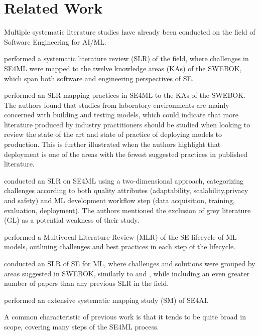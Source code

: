 \chapter{Related Work}
Multiple systematic literature studies have already been conducted on the field of Software Engineering for AI/ML.

\textcite{Kumeno2020} performed a systematic literature review (SLR) of the field, where challenges in SE4ML were mapped to the twelve knowledge areas (KAs) of the SWEBOK, which span both software and engineering perspectives of SE.

\textcite{Nascimento2020} performed an SLR mapping practices in SE4ML to the KAs of the SWEBOK.
The authors found that studies from laboratory environments are mainly concerned with building and testing models, which could indicate that more literature produced by industry practitioners should be studied when looking to review the state of the art and state of practice of deploying models to production.
This is further illustrated when the authors highlight that deployment is one of the areas with the fewest suggested practices in published literature.

\textcite{Lwakatare2020} conducted an SLR on SE4ML using a two-dimensional approach, categorizing  challenges according to both  quality  attributes  (adaptability, scalability,privacy and safety) and ML development workflow step (data acquisition, training, evaluation, deployment).
The authors mentioned the exclusion of grey  literature (GL) as a potential weakness of their study.

\textcite{John2021} performed a Multivocal Literature Review (MLR) of the SE lifecycle of ML models, outlining challenges and best practices in each step of the lifecycle.

\textcite{Giray2021} conducted an SLR of SE for ML, where challenges and solutions were grouped by areas suggested in SWEBOK, similarly to \cite{Kumeno2020} and \cite{Nascimento2020}, while including an even greater number of papers than any previous SLR in the field.

\textcite{MartinezFernandez2021} performed an extensive systematic mapping study (SM) of SE4AI.

A common characteristic of previous work is that it tends to be quite broad in scope, covering many steps of the SE4ML process.